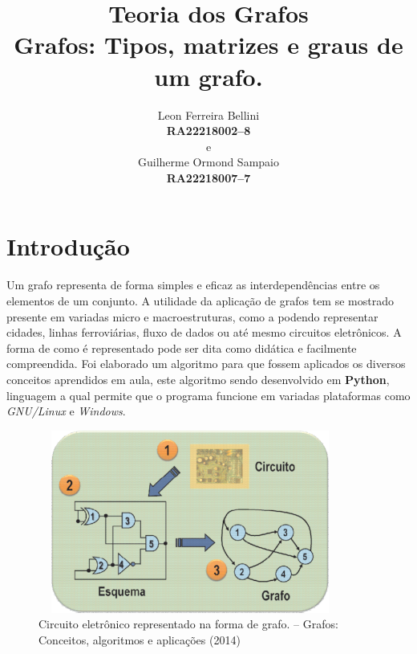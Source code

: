 \documentclass[a4paper, 12pt]{article}
\begin{document}
\title{\textbf{Teoria dos Grafos}\\ \small{Grafos: Tipos, matrizes e graus de um grafo.}}
\author{Leon Ferreira Bellini\\
	\small{\textbf{RA\@ 22218002--8}}\\
	e\\
   Guilherme Ormond Sampaio\\
   \small{\textbf{RA\@ 22218007--7}}
}
\date{}
\maketitle
\section{Introdução}
Um grafo representa de forma simples e eficaz as interdependências entre os elementos de um conjunto. A utilidade da aplicação de grafos tem se mostrado presente em variadas micro e macroestruturas, como a podendo representar cidades, linhas ferroviárias, fluxo de dados ou até mesmo circuitos eletrônicos. A forma de como é representado pode ser dita como didática e facilmente compreendida. Foi elaborado um algoritmo para que fossem aplicados os diversos conceitos aprendidos em aula, este algoritmo sendo desenvolvido em \textbf{Python}, linguagem a qual permite que o programa funcione em variadas plataformas como \textit{GNU/Linux} e \textit{Windows}. 

\begin{center}

	\begin{figure}[hbt]
		\centering
		\includegraphics[width=10cm, height= 6cm]{circuito.png}

	\caption[Figura 1]{Circuito eletrônico representado na forma de grafo. -- Grafos: Conceitos, algoritmos e aplicações (2014) }
	\end{figure}

\end{center}
\end{document}
